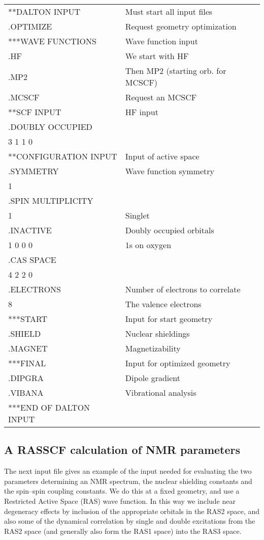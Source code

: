 {\ttfamily
\begin{tabular}{ll}
**DALTON INPUT\hspace{3cm} & Must start all input files\\
.OPTIMIZE & Request geometry optimization\\
***WAVE FUNCTIONS & Wave function input\\ %
.HF & We start with HF\\
.MP2 & Then MP2 (starting orb. for MCSCF)\\
.MCSCF & Request an MCSCF\\
**SCF INPUT & HF input\\
.DOUBLY OCCUPIED\\
 3 1 1 0\\
**CONFIGURATION INPUT & Input of active space\\
.SYMMETRY & Wave function symmetry\\
 1\\
.SPIN MULTIPLICITY\\
 1 & Singlet\\
.INACTIVE & Doubly occupied orbitals\\
 1 0 0 0 & 1s on oxygen\\
.CAS SPACE\\
 4 2 2 0\\
.ELECTRONS & Number of electrons to correlate\\
 8 & The valence electrons\\
***START & Input for start geometry\\
.SHIELD & Nuclear shieldings\\
.MAGNET & Magnetizability\\
***FINAL & Input for optimized geometry\\
.DIPGRA & Dipole gradient\\
.VIBANA & Vibrational analysis\\
***END OF DALTON INPUT\\
\end{tabular}}

\subsection{A RASSCF calculation of NMR parameters}

The next input file gives an example of the input needed for
evaluating the two parameters determining an NMR spectrum, the nuclear
shielding constants and the spin--spin
coupling constants. We do this
at a fixed geometry, and use a Restricted Active Space (RAS) wave
function. In this way we include near degeneracy effects by inclusion
of the appropriate orbitals in the RAS2 space, and also some of the
dynamical correlation  by single and
double excitations
from the RAS2 space (and generally also form the RAS1 space) into the
RAS3 space.

